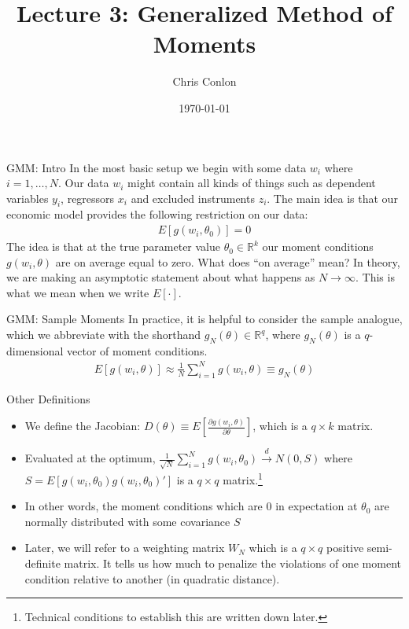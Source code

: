 \documentclass[aspectratio=169]{beamer}
\title{Lecture 3: Generalized Method of Moments}
\author{Chris Conlon }
\institute{NYU Stern }
\date{\today}
\begin{document}
\maketitle

\begin{frame}{GMM: Intro}
In the most basic setup we begin with some data $w_i$ where $i=1,\ldots,N$. Our data $w_i$ might contain all kinds of things such as dependent variables $y_i$, regressors $x_i$ and excluded instruments $z_i$. The main idea is that our economic model provides the following restriction on our data:
\begin{eqnarray*}
E[g(w_i, \theta_0) ] =0
\end{eqnarray*}
The idea is that at the true parameter value $\theta_0\in \mathbb{R}^k$ our moment conditions $g(w_i,\theta)$ are on average equal to zero. What does ``on average'' mean?  In theory, we are making an asymptotic statement about what happens as $N \rightarrow \infty$. This is what we mean when we write $E[\cdot]$.
 \end{frame}

\begin{frame}{GMM: Sample Moments}
In practice, it is helpful to consider the sample analogue, which we abbreviate with the shorthand $g_N(\theta) \in \mathbb{R}^q$, where $g_N(\theta)$ is a $q$-dimensional vector of moment conditions.
\begin{eqnarray*}
E[g(w_i, \theta )] \approx \frac{1}{N} \sum_{i=1}^N g(w_i, \theta)  \equiv g_N(\theta)
\end{eqnarray*}
\end{frame}

\begin{frame}{Other Definitions}
\begin{itemize}
\item We define the Jacobian: $D(\theta) \equiv E[\frac{\partial g(w_i,\theta)}{\partial \theta}]$, which is a $q \times k$ matrix.
\item  Evaluated at the optimum, $\frac{1}{\sqrt{N}} \sum_{i=1}^N g(w_i,\theta_0) \overset{d}{\to} N(0,S)$ where $S = E[g(w_i,\theta_0) g(w_i,\theta_0)']$ is a $q \times q$ matrix.\footnote{Technical conditions to establish this are written down later.} 
\item In other words, the moment conditions which are $0$ in expectation at $\theta_0$ are normally distributed with some covariance $S$
\item Later, we will refer to a weighting matrix $W_N$ which is a $q \times q$ positive semi-definite matrix. It tells us how much to penalize the violations of one moment condition relative to another (in quadratic distance).
\end{itemize}
\end{frame}
\end{document}
